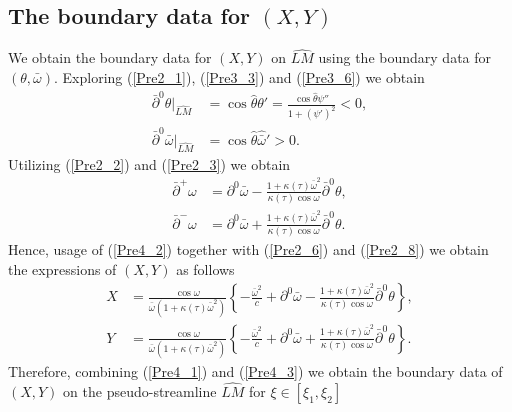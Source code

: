 \documentclass[3p,11pt]{elsarticle}
\numberwithin{equation}{section}
\begin{document}
\subsection{The boundary data for $({X}, {Y})$}

We obtain the boundary data for $({X}, {Y})$ on $\widehat{LM}$ using the boundary data for $(\theta,\bar\omega)$. Exploring (\ref{Pre2_1}), (\ref{Pre3_3}) and (\ref{Pre3_6}) we obtain
\begin{equation}\label{Pre4_1}
    \begin{split}
        \bar\partial^0\theta|_{\widehat{LM}}&=\cos\hat \theta\theta'=\frac{\cos\hat \theta\psi''}{1+(\psi')^2}<0,\\
        \bar\partial^0\bar\omega|_{\widehat{LM}}&=\cos\hat \theta{\hat{\bar\omega}}'>0.
    \end{split}
\end{equation}
Utilizing (\ref{Pre2_2}) and (\ref{Pre2_3}) we obtain
\begin{equation}\label{Pre4_2}
    \begin{split}
        \bar\partial^+\omega &=\partial^0\bar\omega-\frac{1+\kappa(\tau)\bar\omega^2}{\kappa(\tau)\cos\omega}\bar\partial^0\theta,\\
        \bar\partial^-\omega &=\partial^0\bar\omega+\frac{1+\kappa(\tau)\bar\omega^2}{\kappa(\tau)\cos\omega}\bar\partial^0\theta.
    \end{split}
\end{equation}
Hence, usage of (\ref{Pre4_2}) together with (\ref{Pre2_6}) and (\ref{Pre2_8}) we obtain the expressions of $({X}, { Y})$ as follows
\begin{equation}\label{Pre4_3}
    \begin{split}
        {X} &= \frac{\cos\omega}{\bar\omega(1+\kappa(\tau)\bar\omega^2)} \left\{-\frac{\bar\omega^2}{c}+\partial^0\bar\omega-\frac{1+\kappa(\tau)\bar\omega^2}{\kappa(\tau)\cos\omega}\bar\partial^0\theta \right\}, \\
        { Y} &= \frac{\cos\omega}{\bar\omega(1+\kappa(\tau)\bar\omega^2)} \left\{-\frac{\bar\omega^2}{c}+\partial^0\bar\omega+\frac{1+\kappa(\tau)\bar\omega^2}{\kappa(\tau)\cos\omega}\bar\partial^0\theta \right\}. 
    \end{split}
\end{equation}
Therefore, combining (\ref{Pre4_1}) and (\ref{Pre4_3}) we obtain the boundary data of $({X}, { Y})$ on the pseudo-streamline $\widehat{LM}$ for $\xi\in[\xi_1,\xi_2]$
\end{document}
